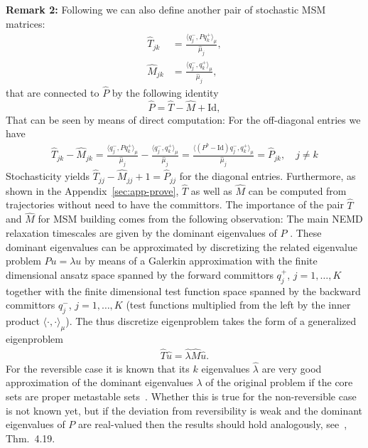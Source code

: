 \documentclass[aps, pre, preprint,unsortedaddress,a4paper,onecolumn]{revtex4}
\newcommand{\fwd}[0]{+}
\newcommand{\bwd}[0]{-}
\newcommand{\id}{\mathrm{Id}}
\begin{document}
\textbf{Remark 2:}
Following \cite{A19-31} we can also define another pair of stochastic MSM matrices: 
\begin{align}\label{eq:msm-ht-1}
  \hat T_{jk} &= \frac{\langle q_j^\bwd, P q_k^\fwd \rangle_\mu}{\hat \mu_j},\\\label{eq:msm-hm-1}
  \hat M_{jk} &= \frac{\langle q_j^\bwd, q_k^\fwd \rangle_\mu}{\hat \mu_j},
\end{align}
that are connected to $\hat{P}$ by the following identity
\[
\hat{P}=\hat{T}-\hat{M}+\id,
\]
That can be seen by means of direct computation: For the off-diagonal entries we have
\begin{align}\label{eq:msm-tmp26}
  \hat T_{jk} - \hat M_{jk}
  = \frac{\langle q_j^\bwd, P q_k^\fwd \rangle_\mu}{\hat \mu_j}
  - \frac{\langle q_j^\bwd,  q_k^\fwd \rangle_\mu}{\hat \mu_j}
  = \frac{\langle (P^b - \id) q_j^\bwd, q_k^\fwd \rangle_\mu}{\hat \mu_j}
  = \hat P_{jk}, \quad j\neq k
\end{align}
Stochasticity yields
$\hat T_{jj} - \hat M_{jj} + 1 = \hat P_{jj}$ for the diagonal entries.  Furthermore, as shown in the Appendix~\ref{sec:app-prove}, $\hat{T}$ as well as $\hat{M}$ can be computed from trajectories without need to have the committors. 
The importance of the pair $\hat{T}$ and $\hat{M}$ for MSM building comes from the following observation: The main NEMD relaxation timescales are given by the dominant eigenvalues of $P$ \cite{A19-31, A19-1}.
These dominant eigenvalues can be approximated by discretizing the related eigenvalue problem $Pu=\lambda u$ by means of a Galerkin approximation with the finite dimensional ansatz space 
spanned by the forward committors $q^+_j$, $j=1,\ldots,K$ together  with the finite dimensional test function space spanned by the backward committors $q^-_j$, $j=1,\ldots,K$ (test functions multiplied from the left by the inner product $\langle\cdot,\cdot\rangle_\mu$). The thus discretize eigenproblem takes the form  of a generalized eigenproblem
\begin{align}
  \label{eq:msm-gen-ev}
\hat{T}\hat{u}=\hat{\lambda}\hat{M}\hat{u}.  
\end{align}
For the reversible case it is known that its $k$ eigenvalues $\hat{\lambda}$ are very good approximation of the dominant eigenvalues $\lambda$ of the original problem if the core sets are proper metastable sets~\cite{Eigenvalues}. Whether this is true for the non-reversible case is not known yet, but if the deviation from reversibility is weak and the dominant eigenvalues of $P$ are real-valued then the results should hold analogously, see~\cite{A19-31}, Thm.~4.19. 
\end{document}
